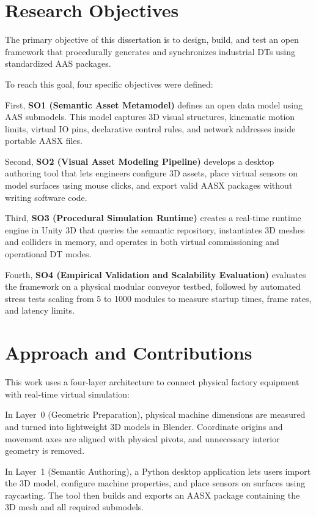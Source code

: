 \section{Research Objectives}

The primary objective of this dissertation is to design, build, and test an open framework that procedurally generates and synchronizes industrial \glspl{DT} using standardized \gls{AAS} packages.

To reach this goal, four specific objectives were defined:

First, \textbf{SO1 (Semantic Asset Metamodel)} defines an open data model using \gls{AAS} submodels. This model captures 3D visual structures, kinematic motion limits, virtual \gls{IO} pins, declarative control rules, and network addresses inside portable \gls{AASX} files.

Second, \textbf{SO2 (Visual Asset Modeling Pipeline)} develops a desktop authoring tool that lets engineers configure 3D assets, place virtual sensors on model surfaces using mouse clicks, and export valid \gls{AASX} packages without writing software code.

Third, \textbf{SO3 (Procedural Simulation Runtime)} creates a real-time runtime engine in Unity 3D that queries the semantic repository, instantiates 3D meshes and colliders in memory, and operates in both virtual commissioning and operational \gls{DT} modes.

Fourth, \textbf{SO4 (Empirical Validation and Scalability Evaluation)} evaluates the framework on a physical modular conveyor testbed, followed by automated stress tests scaling from 5 to 1000 modules to measure startup times, frame rates, and latency limits.

\section{Approach and Contributions}

This work uses a four-layer architecture to connect physical factory equipment with real-time virtual simulation:

In Layer~0 (Geometric Preparation), physical machine dimensions are measured and turned into lightweight 3D models in Blender. Coordinate origins and movement axes are aligned with physical pivots, and unnecessary interior geometry is removed.

In Layer~1 (Semantic Authoring), a Python desktop application lets users import the 3D model, configure machine properties, and place sensors on surfaces using raycasting. The tool then builds and exports an \gls{AASX} package containing the 3D mesh and all required submodels.

